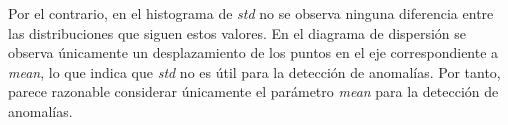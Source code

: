 Por el contrario, en el histograma de \textit{std} no se observa ninguna diferencia entre las distribuciones que siguen estos valores. En el diagrama de dispersión se observa únicamente un desplazamiento de los puntos en el eje correspondiente a \textit{mean}, lo que indica que \textit{std} no es útil para la detección de anomalías.
Por tanto, parece razonable considerar únicamente el parámetro \textit{mean} para la detección de anomalías.